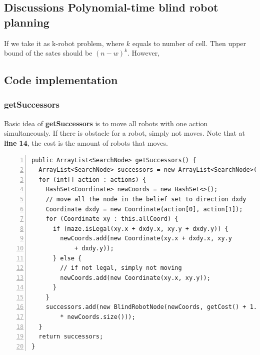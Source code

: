 \documentclass{article}
\begin{document}
\subsection{Discussions Polynomial-time blind robot planning}
If we take it as k-robot problem, where $k$ equals to number of cell. Then upper bound of the sates should be $(n-w)^k$. However, 

\subsection{Code implementation}

\subsubsection{getSuccessors}
Basic idea of \textbf{getSuccessors} is to move all robots with one action simultaneously. If there is obstacle for a robot, simply not moves. Note that at  \textbf{line 14}, the cost is the amount of robots that moves.
\begin{lstlisting}[numbers=left]
public ArrayList<SearchNode> getSuccessors() {
  ArrayList<SearchNode> successors = new ArrayList<SearchNode>();
  for (int[] action : actions) {
    HashSet<Coordinate> newCoords = new HashSet<>();
    // move all the node in the belief set to direction dxdy
    Coordinate dxdy = new Coordinate(action[0], action[1]);
    for (Coordinate xy : this.allCoord) {
      if (maze.isLegal(xy.x + dxdy.x, xy.y + dxdy.y)) {
        newCoords.add(new Coordinate(xy.x + dxdy.x, xy.y
            + dxdy.y));
      } else {
        // if not legal, simply not moving
        newCoords.add(new Coordinate(xy.x, xy.y));
      }
    }
    successors.add(new BlindRobotNode(newCoords, getCost() + 1.0
        * newCoords.size()));
  }
  return successors;
}
\end{lstlisting}
\end{document}
